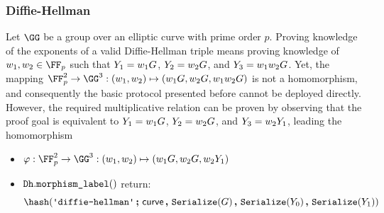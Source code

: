 \documentclass[11pt]{article}
\begin{document}
\subsubsection{Diffie-Hellman}
Let $\GG$ be a group over an elliptic curve with prime order $p$.
Proving knowledge of the exponents of a valid Diffie-Hellman triple means proving knowledge of $\witness_1,\witness_2\in\FF_p$ such that $Y_1=w_1G$, $Y_2=w_2G$, and $Y_3=w_1 w_2 G$.
Yet, the mapping $\FF_p^2\to\GG^3:(\witness_1,\witness_2)\mapsto (\witness_1G,\witness_2G,\witness_1\witness_2G)$ is not a homomorphism, and consequently the basic protocol presented before cannot be deployed directly.
However, the required multiplicative relation can be proven by observing that the proof goal is equivalent to $Y_1=w_1G$, $Y_2=w_2G$, and $Y_3=w_2Y_1$, leading the homomorphism

\begin{itemize}
  \item  $\varphi:\FF_p^2\to\GG^3:(\witness_1,\witness_2)\mapsto(\witness_1G,\witness_2G,\witness_2\statement_1)$
  \item $\texttt{Dh}.\texttt{morphism\_label}()$ return:
  \[
    \hash(\dhlabel \concatblock \curvectx \concat \serialize(G) \concat \serialize(\statement_0) \concat \serialize(\statement_1))
  \]
\end{itemize}
\end{document}
